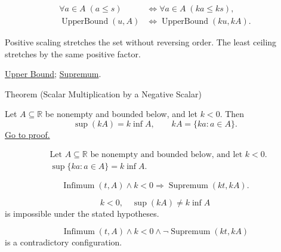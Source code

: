 \begin{remark*}
\[
\begin{aligned}
\forall a\in A\;(a\le s)
&\Longleftrightarrow
\forall a\in A\;(ka\le ks),\\
\operatorname{UpperBound}(u,A)
&\Longleftrightarrow
\operatorname{UpperBound}(ku,kA).
\end{aligned}
\]
\end{remark*}

\begin{remark*}[Interpretation]
Positive scaling stretches the set without reversing order. The least ceiling stretches by the same positive factor.
\end{remark*}

\begin{dependencies}
\hyperref[def:upper-bound]{Upper Bound};
\hyperref[def:supremum]{Supremum}.
\end{dependencies}


\begin{theorembox}{Theorem (Scalar Multiplication by a Negative Scalar)}
\begin{theorem}
\label{thm:scalar-mult-negative}
Let $A\subseteq\mathbb{R}$ be nonempty and bounded below, and let $k<0$. Then
\[
  \sup(kA)=k\inf A,
  \qquad
  kA=\{ka:a\in A\}.
\]
\hyperref[prf:scalar-mult-negative]{Go to proof.}
\end{theorem}
\end{theorembox}

\begin{remark*}
\[
\begin{aligned}
&\text{Let }A\subseteq\mathbb{R}\text{ be nonempty and bounded below, and let }k<0.\\
&\sup\{ka:a\in A\}=k\inf A.
\end{aligned}
\]
\end{remark*}

\begin{remark*}
\[
\operatorname{Infimum}(t,A)\land k<0
\Longrightarrow
\operatorname{Supremum}(kt,kA).
\]
\end{remark*}

\begin{remark*}
\[
k<0,\quad \sup(kA)\ne k\inf A
\]
is impossible under the stated hypotheses.
\end{remark*}

\begin{remark*}
\[
\operatorname{Infimum}(t,A)\land k<0\land \neg\operatorname{Supremum}(kt,kA)
\]
is a contradictory configuration.
\end{remark*}

